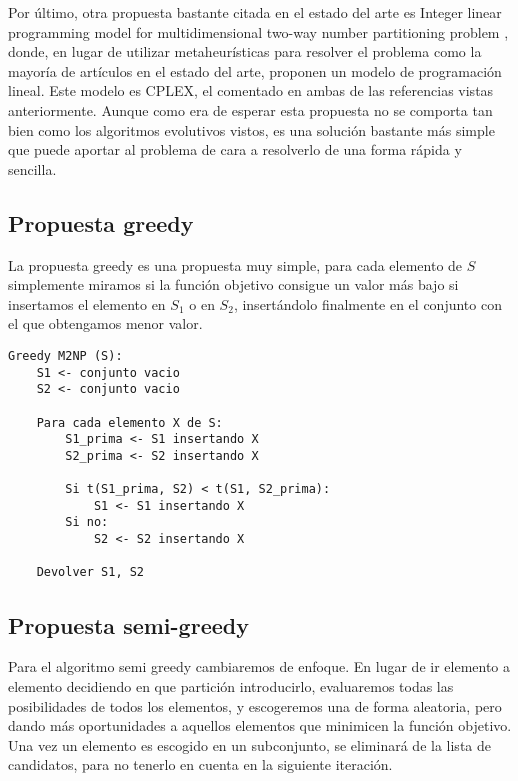 Por último, otra propuesta bastante citada en el estado del arte es Integer linear programming model for multidimensional two-way number partitioning problem \cite{programacionLinealM2NP}, donde, en lugar de utilizar metaheurísticas para resolver el problema como la mayoría de artículos en el estado del arte, proponen un modelo de programación lineal. Este modelo es CPLEX, el comentado en ambas de las referencias vistas anteriormente. Aunque como era de esperar esta propuesta no se comporta tan bien como los algoritmos evolutivos vistos, es una solución bastante más simple que puede aportar al problema de cara a resolverlo de una forma rápida y sencilla.

\subsection{Propuesta greedy}

La propuesta greedy es una propuesta muy simple, para cada elemento de $S$ simplemente miramos si la función objetivo consigue un valor más bajo si insertamos el elemento en $S_1$ o en $S_2$, insertándolo finalmente en el conjunto con el que obtengamos menor valor.

\begin{lstlisting}
Greedy M2NP (S):
	S1 <- conjunto vacio
	S2 <- conjunto vacio

	Para cada elemento X de S:
		S1_prima <- S1 insertando X
		S2_prima <- S2 insertando X

		Si t(S1_prima, S2) < t(S1, S2_prima):
			S1 <- S1 insertando X
		Si no:
			S2 <- S2 insertando X

	Devolver S1, S2
\end{lstlisting}


\subsection{Propuesta semi-greedy}

Para el algoritmo semi greedy cambiaremos de enfoque. En lugar de ir elemento a elemento decidiendo en que partición introducirlo, evaluaremos todas las posibilidades de todos los elementos, y escogeremos una de forma aleatoria, pero dando más oportunidades a aquellos elementos que minimicen la función objetivo. Una vez un elemento es escogido en un subconjunto, se eliminará de la lista de candidatos, para no tenerlo en cuenta en la siguiente iteración.

